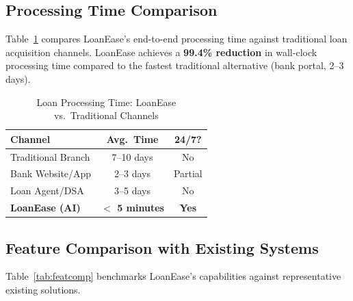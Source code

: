 \documentclass[conference]{IEEEtran}
\begin{document}
\subsection{Processing Time Comparison}

Table~\ref{tab:proctime} compares LoanEase's end-to-end
processing time against traditional loan acquisition
channels. LoanEase achieves a \textbf{99.4\% reduction}
in wall-clock processing time compared to the fastest
traditional alternative (bank portal, 2--3 days).

\begin{table}[H]
\centering
\caption{Loan Processing Time: LoanEase vs.\ Traditional Channels}
\label{tab:proctime}
\renewcommand{\arraystretch}{1.15}
\begin{tabular}{@{}lcc@{}}
\toprule
\textbf{Channel} & \textbf{Avg.\ Time} & \textbf{24/7?} \\
\midrule
Traditional Branch    & 7--10 days   & No  \\
Bank Website/App      & 2--3 days    & Partial \\
Loan Agent/DSA        & 3--5 days    & No  \\
\textbf{LoanEase (AI)} & \textbf{$<$ 5 minutes} & \textbf{Yes} \\
\bottomrule
\end{tabular}
\end{table}

\subsection{Feature Comparison with Existing Systems}

Table~\ref{tab:featcomp} benchmarks LoanEase's
capabilities against representative existing solutions.

\begin{table}[H]
\centering
\caption{Feature Comparison: LoanEase vs.\ Existing Systems}
\label{tab:featcomp}
\renewcommand{\arraystretch}{1.15}
\end{table}
\end{document}
